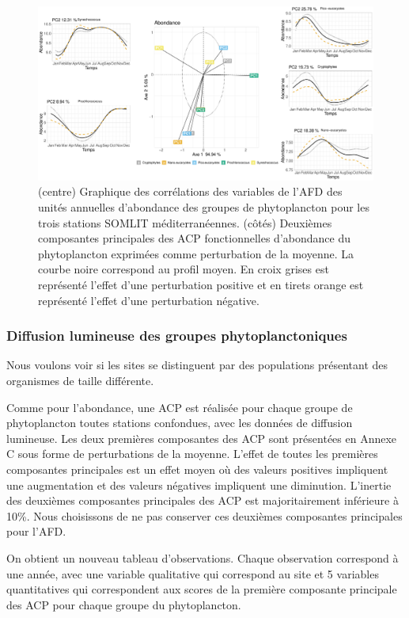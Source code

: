 \documentclass[12pt]{article}
\begin{document}
\begin{figure}
\centering
\hspace*{-35pt}
\includegraphics[width=1.1\textwidth]{fig/R222_fda_fpca_ab.pdf}
\caption{(centre) Graphique des corrélations des variables de l'AFD des unités annuelles d'abondance des groupes de phytoplancton pour les trois stations SOMLIT méditer\-ranéennes. (côtés) Deuxièmes composantes principales des ACP fonctionnelles d'abondance du phytoplancton exprimées comme perturbation de la moyenne. La courbe noire correspond au profil moyen. En croix grises est représenté l’effet d’une perturbation positive et en tirets orange est représenté l’effet d’une perturbation négative.}
\label{afd_ab_var}
\end{figure}

\subsubsection{Diffusion lumineuse des groupes phytoplanctoniques}

Nous voulons voir si les sites se distinguent par des populations présentant des organismes de taille différente. 

Comme pour l’abondance, une ACP est réalisée pour chaque groupe de phytoplancton toutes stations confondues, avec les données de diffusion lumineuse. Les deux premières composantes des ACP sont présentées en Annexe C sous forme de perturbations de la moyenne. L’effet de toutes les premières composantes principales est un effet moyen où des valeurs positives impliquent une augmentation et des valeurs négatives impliquent une diminution. L’inertie des deuxièmes composantes principales des ACP est majoritairement inférieure à 10\%. Nous choisissons de ne pas conserver ces deuxièmes composantes principales pour l’AFD.

On obtient un nouveau tableau d’observations. Chaque observation correspond à une année, avec une variable qualitative qui correspond au site et 5 variables quantitatives qui correspondent aux scores de la première composante principale des ACP pour chaque groupe du phytoplancton. 
\end{document}
